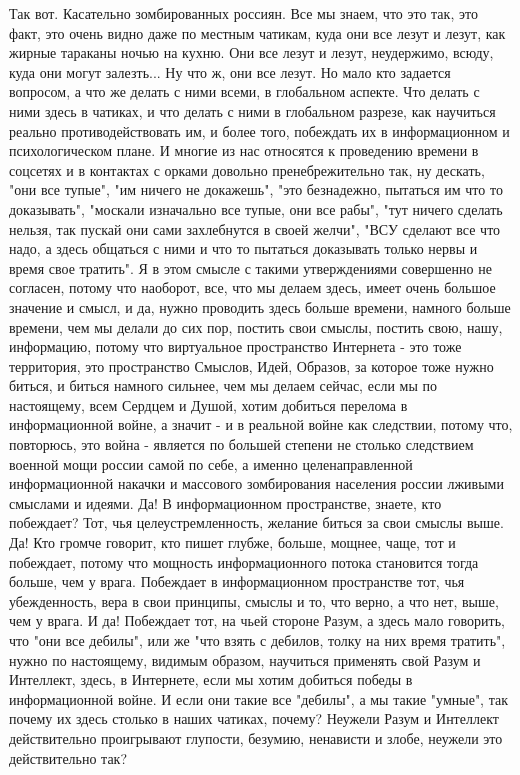 Так вот. Касательно зомбированных россиян. Все мы знаем, что это так, это факт,
это очень видно даже по местным чатикам, куда они все лезут и лезут, как жирные
тараканы ночью на кухню. Они все лезут и лезут, неудержимо, всюду, куда они
могут залезть...  Ну что ж, они все лезут. Но мало кто задается вопросом, а что
же делать с ними всеми, в глобальном аспекте. Что делать с ними здесь в
чатиках, и что делать с ними в глобальном разрезе, как научиться реально
противодействовать им, и более того, побеждать их в информационном и
психологическом плане.  И многие из нас относятся к проведению времени в
соцсетях и в контактах с орками довольно пренебрежительно так, ну дескать, "они
все тупые", "им ничего не докажешь", "это безнадежно, пытаться им что то
доказывать", "москали изначально все тупые, они все рабы", "тут ничего сделать
нельзя, так пускай они сами захлебнутся в своей желчи", "ВСУ сделают все что
надо, а здесь общаться с ними и что то пытаться доказывать только нервы и время
свое тратить". Я в этом смысле с такими утверждениями совершенно не согласен,
потому что наоборот, все, что мы делаем здесь, имеет очень большое значение и
смысл, и да, нужно проводить здесь больше времени, намного больше времени, чем
мы делали до сих пор, постить свои смыслы, постить свою, нашу, информацию,
потому что виртуальное пространство Интернета - это тоже территория, это
пространство Смыслов, Идей, Образов, за которое тоже нужно биться, и биться
намного сильнее, чем мы делаем сейчас, если мы по настоящему, всем Сердцем и
Душой, хотим добиться перелома в информационной войне, а значит - и в реальной
войне как следствии, потому что, повторюсь, это война - является по большей
степени не столько следствием военной мощи россии самой по себе, а именно целенаправленной
информационной накачки и массового зомбирования населения россии лживыми смыслами и идеями. Да! В
информационном пространстве, знаете, кто побеждает? Тот, чья
целеустремленность, желание биться за свои смыслы выше. Да! Кто громче говорит,
кто пишет глубже, больше, мощнее, чаще, тот и побеждает, потому что мощность информационного потока становится тогда больше, чем у врага.
Побеждает в информационном пространстве тот, чья убежденность, вера в свои принципы, смыслы и то, что верно,
а что нет, выше, чем у врага. И да! Побеждает тот, на чьей стороне Разум, а здесь мало говорить, что "они все дебилы", или же "что взять с дебилов, толку на них время тратить", нужно по настоящему, видимым образом, научиться применять свой Разум и Интеллект, здесь, в Интернете, если мы хотим добиться победы в информационной войне. И если они такие все "дебилы", а мы такие "умные", так почему их здесь столько в наших чатиках, почему? Неужели Разум и Интеллект действительно проигрывают глупости, безумию, ненависти и злобе, неужели это действительно так?

